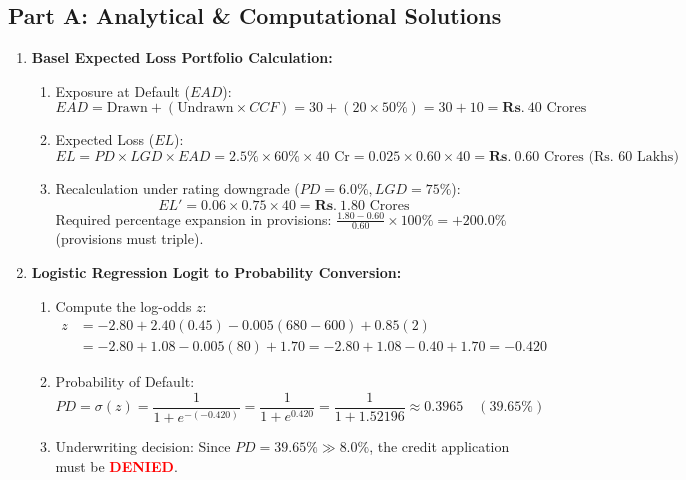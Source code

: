 \subsection*{Part A: Analytical \& Computational Solutions}

\begin{enumerate}[label=\textbf{P8.\arabic*}]
    \item \textbf{Basel Expected Loss Portfolio Calculation:}
    \begin{enumerate}[label=(\alph*)]
        \item Exposure at Default ($EAD$):
        \begin{equation*}
        EAD = \text{Drawn} + (\text{Undrawn} \times CCF) = 30 + (20 \times 50\%) = 30 + 10 = \mathbf{Rs.~} 40\text{ Crores}
        \end{equation*}
        \item Expected Loss ($EL$):
        \begin{equation*}
        EL = PD \times LGD \times EAD = 2.5\% \times 60\% \times 40\text{ Cr} = 0.025 \times 0.60 \times 40 = \mathbf{Rs.~} 0.60\text{ Crores (Rs.~60 Lakhs)}
        \end{equation*}
        \item Recalculation under rating downgrade ($PD = 6.0\%, LGD = 75\%$):
        \begin{equation*}
        EL' = 0.06 \times 0.75 \times 40 = \mathbf{Rs.~} 1.80\text{ Crores}
        \end{equation*}
        Required percentage expansion in provisions: $\frac{1.80 - 0.60}{0.60} \times 100\% = \mathbf{+200.0\%}$ (provisions must triple).
    \end{enumerate}

    \item \textbf{Logistic Regression Logit to Probability Conversion:}
    \begin{enumerate}[label=(\alph*)]
        \item Compute the log-odds $z$:
        \begin{align*}
        z &= -2.80 + 2.40(0.45) - 0.005(680 - 600) + 0.85(2) \\
        &= -2.80 + 1.08 - 0.005(80) + 1.70 = -2.80 + 1.08 - 0.40 + 1.70 = \mathbf{-0.420}
        \end{align*}
        \item Probability of Default:
        \begin{equation*}
        PD = \sigma(z) = \frac{1}{1 + e^{-(-0.420)}} = \frac{1}{1 + e^{0.420}} = \frac{1}{1 + 1.52196} \approx \mathbf{0.3965 \quad (39.65\%)}
        \end{equation*}
        \item Underwriting decision: Since $PD = 39.65\% \gg 8.0\%$, the credit application must be \textcolor{red}{\textbf{DENIED}}.
    \end{enumerate}


\end{enumerate}
